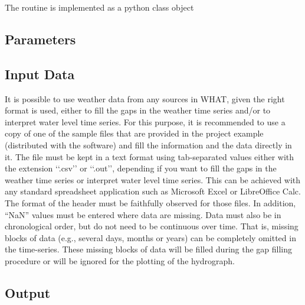 \documentclass[TechnicalNoteMeteo.tex]{subfiles}
\begin{document}
The routine is implemented as a python class object 

\subsection{Parameters}\label{sec:parameters}



\subsection{Input Data}

It is possible to use weather data from any sources in WHAT, given the right format is used, either to fill the gaps in the weather time series and/or to interpret water level time series. For this purpose, it is recommended to use a copy of one of the sample files that are provided in the project example (distributed with the software) and fill the information and the data directly in it. The file must be kept in a text format using tab-separated values either with the extension ‘‘.csv’’ or ‘‘.out’’, depending if you want to fill the gaps in the weather time series or  interpret water level time series. This can be achieved with any standard spreadsheet application such as Microsoft Excel or LibreOffice Calc. The format of the header must be faithfully observed for those files. In addition, ``NaN'' values must be entered where data are missing. Data must also be in chronological order, but do not need to be continuous over time. That is, missing blocks of data (e.g., several days, months or years) can be completely omitted in the time-series. These missing blocks of data will be filled during the gap filling procedure or will be ignored for the plotting of the hydrograph.

\subsection{Output}\label{sec:output}
\end{document}
